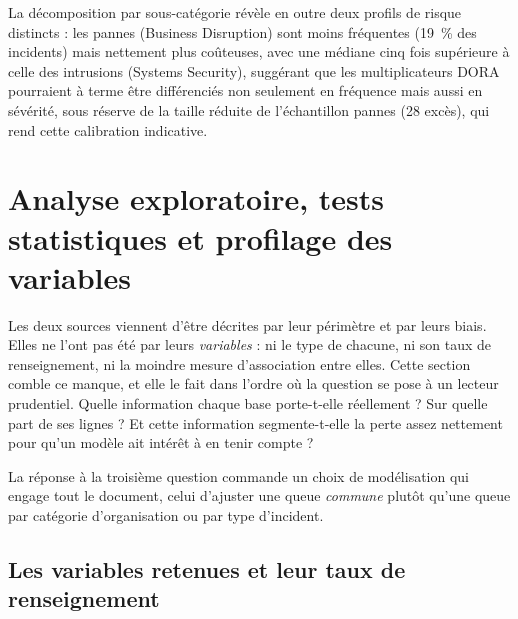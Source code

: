 La décomposition par sous-catégorie révèle en outre deux profils de risque
distincts : les pannes (\og Business Disruption\fg{}) sont moins fréquentes
(19~\% des incidents) mais nettement plus coûteuses, avec une médiane cinq
fois supérieure à celle des intrusions (\og Systems Security\fg{}), suggérant que
les multiplicateurs DORA pourraient à terme être différenciés non seulement
en fréquence mais aussi en sévérité, sous réserve de la taille réduite de
l'échantillon \og pannes\fg{} (28 excès), qui rend cette calibration indicative.





\section{Analyse exploratoire, tests statistiques et profilage des variables}

Les deux sources viennent d'être décrites par leur périmètre et par leurs biais. Elles ne
l'ont pas été par leurs \emph{variables} : ni le type de chacune, ni son taux de renseignement,
ni la moindre mesure d'association entre elles. Cette section comble ce manque, et elle le fait
dans l'ordre où la question se pose à un lecteur prudentiel. Quelle information chaque base
porte-t-elle réellement ? Sur quelle part de ses lignes ? Et cette information segmente-t-elle
la perte assez nettement pour qu'un modèle ait intérêt à en tenir compte ?

La réponse à la troisième question commande un choix de modélisation qui engage tout le
document, celui d'ajuster une queue \emph{commune} plutôt qu'une queue par catégorie
d'organisation ou par type d'incident.

\subsection{Les variables retenues et leur taux de renseignement}
\label{subsec:table-variables}


